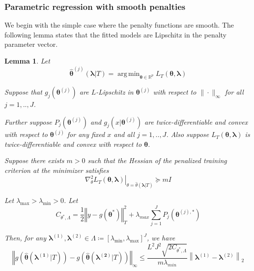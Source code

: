 \documentclass[12pt]{article}
\newtheorem{lemma}{Lemma}
\DeclareMathOperator*{\argmin}{arg\,min}
\begin{document}
\subsubsection{Parametric regression with smooth penalties}
\label{sec:param_smooth}
We begin with the simple case where the penalty functions are smooth. The following lemma states that the fitted models are Lipschitz in the penalty parameter vector.
\begin{lemma}
	\label{lemma:param_add}
	Let 
	\begin{equation}
	\label{eq:param_add_estimator}
	\hat{\boldsymbol{\theta}}^{(j)}\left (\boldsymbol{\lambda} | T \right )  = 
	\argmin_{\boldsymbol{\theta} \in \mathbb{R}^p} L_T \left (\boldsymbol{\theta}, \boldsymbol{\lambda} \right)
	\end{equation}
	
	\noindent
	Suppose that $g_j(\boldsymbol{\theta}^{(j)})$ are $L$-Lipschitz in $\boldsymbol{\theta}^{(j)}$ with respect to $\| \cdot \|_\infty$ for all $j=1,..,J$.
	
	\noindent
	Further suppose $P_j(\boldsymbol{\theta}^{(j)})$ and $g_j(x | \boldsymbol{\theta}^{(j)})$ are twice-differentiable and convex with respect to $\boldsymbol{\theta}^{(j)}$ for any fixed $x$ and all $j=1,..,J$. Also suppose $L_T \left (\boldsymbol{\theta}, \boldsymbol{\lambda} \right)$ is twice-differentiable and convex with respect to $\boldsymbol{\theta}$.
	
	Suppose there exists $m > 0$ such that the Hessian of the penalized training criterion at the minimizer satisfies 
	\begin{equation}
	\left . \nabla_{\theta}^2 L_T \left (\boldsymbol{\theta}, \boldsymbol{\lambda} \right) \right |_{\theta = \hat{\theta}(\boldsymbol{\lambda} | T )} \succeq mI
	\end{equation}
	
	Let $\lambda_{\max} > \lambda_{\min} > 0 $. Let
	\begin{equation}
	C_{\theta^{*},\Lambda}=
	\frac{1}{2}\left\Vert y- g(\boldsymbol{\theta}^{*})\right\Vert _{T}^{2}
	+\lambda_{max}\sum_{j=1}^{J} P_{j}(\boldsymbol{\theta}^{(j),*})
	\end{equation}
	
	Then, for any $\boldsymbol{\lambda}^{(1)}, \boldsymbol{\lambda}^{(2)} \in \Lambda \coloneqq \left [ \lambda_{\min}, \lambda_{\max} \right ]^J$, we have
	\begin{equation}
	\label{eq:param_add_lipschitz}
	\left\Vert g\left(\hat{\boldsymbol{\theta}}(\boldsymbol{\lambda^{(1)}} | T)\right)-
	g\left(\hat{\boldsymbol{\theta}}(\boldsymbol{\lambda^{(2)}}| T)\right)\right\Vert _{\infty}
	\le
	\frac{L^{2}J^{2}\sqrt{2C_{\theta^{*},\Lambda}}}{m \lambda_{min}}
	\left \|\boldsymbol{\lambda}^{(1)}-\boldsymbol{\lambda}^{(2)} \right \|_2
	\end{equation}
\end{lemma}
\end{document}
